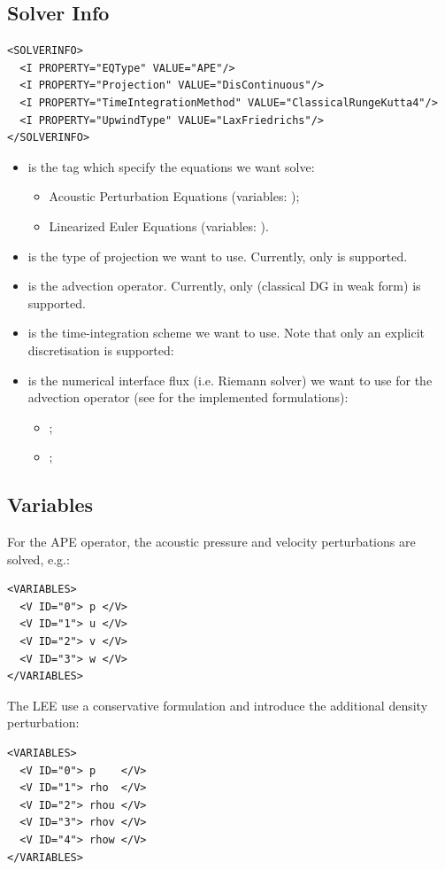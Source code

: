 \subsection{Solver Info}
\begin{lstlisting}[style=XmlStyle]
<SOLVERINFO>
  <I PROPERTY="EQType" VALUE="APE"/>
  <I PROPERTY="Projection" VALUE="DisContinuous"/>
  <I PROPERTY="TimeIntegrationMethod" VALUE="ClassicalRungeKutta4"/>
  <I PROPERTY="UpwindType" VALUE="LaxFriedrichs"/>
</SOLVERINFO>
\end{lstlisting}
\begin{itemize}
    \item {} is the tag which specify the equations we want solve:
    \begin{itemize}
        \item {} Acoustic Perturbation Equations (variables: );
        \item {} Linearized Euler Equations (variables: ).
    \end{itemize}
    \item {} is the type of projection we want to use. Currently, only  is supported.
    \item {} is the advection operator. Currently, only  (classical DG in weak form) is supported.
    \item {} is the time-integration scheme we want to use. 
    Note that only an explicit discretisation is supported:
    \item {} is the numerical interface flux (i.e. Riemann solver) 
    we want to use for the advection operator (see \cite{La18} for the implemented formulations):
    \begin{itemize}
        \item {};
        \item {}; 
    \end{itemize}
\end{itemize}

\subsection{Variables}
For the APE operator, the acoustic pressure and velocity perturbations are solved, e.g.:
\begin{lstlisting}[style=XmlStyle]
<VARIABLES>
  <V ID="0"> p </V>
  <V ID="1"> u </V>
  <V ID="2"> v </V>
  <V ID="3"> w </V>
</VARIABLES>
\end{lstlisting}
The LEE use a conservative formulation and introduce the additional density perturbation:
\begin{lstlisting}[style=XmlStyle]
<VARIABLES>
  <V ID="0"> p    </V>
  <V ID="1"> rho  </V>
  <V ID="2"> rhou </V>
  <V ID="3"> rhov </V>
  <V ID="4"> rhow </V>
</VARIABLES>
\end{lstlisting}


